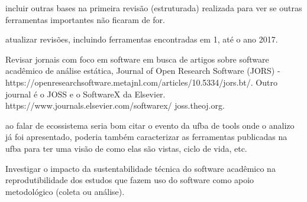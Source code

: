 incluir outras bases na primeira revisão (estruturada) realizada para
ver se outras ferramentas importantes não ficaram de for.

atualizar revisões, incluindo ferramentas encontradas em 1, até o ano 2017. 

Revisar jornais com foco em software em busca de artigos sobre
software acadêmico de análise estática, 
Journal of Open Research Software (JORS) -
 https://openresearchsoftware.metajnl.com/articles/10.5334/jors.bt/.
Outro journal é o JOSS e o SoftwareX da Elsevier. https://www.journals.elsevier.com/softwarex/ joss.theoj.org.

ao falar de ecossistema seria bom citar o evento da ufba de tools onde o
analizo já foi apresentado, poderia também caracterizar as ferramentas
publicadas na ufba para ter uma visão de como elas são vistas, ciclo de vida,
etc.

Investigar o impacto da sustentabilidade técnica do software acadêmico na
reprodutibilidade dos estudos que fazem uso do software como apoio metodológico
(coleta ou análise).





